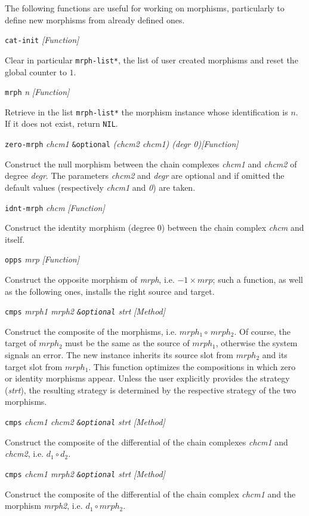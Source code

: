 The following functions are useful for working on morphisms, particularly to define
new morphisms from already defined ones.
\vskip 0.50cm
{\parindent=0mm
{\leftskip=5mm
{\tt cat-init} \hfill {\em [Function]} \par}
{\leftskip=15mm
Clear in particular {\tt *mrph-list*}, the list of user created morphisms  and reset
the global counter to $1$. \par}
{\leftskip=5mm
{\tt mrph} {\em n} \hfill {\em [Function]}\par}
{\leftskip=15mm
Retrieve in the list {\tt *mrph-list*} the morphism instance whose identification
is $n$. If it does not exist, return {\tt NIL}. \par}
{\leftskip=5mm
{\tt zero-mrph} {\em chcm1} {\tt \&optional} {\em (chcm2 chcm1) (degr 0)}\hfill {\em [Function]} \par}
{\leftskip=15mm
Construct the null morphism between the chain complexes {\em chcm1} and {\em chcm2} of degree {\em degr}.
The parameters {\em chcm2} and {\em degr} are optional and if omitted the  default values
(respectively {\em chcm1} and {\em 0}) are taken.  \par}
{\leftskip=5mm
{\tt idnt-mrph} {\em chcm} \hfill{\em [Function]}\par }
{\leftskip=15mm
Construct the identity morphism (degree $0$) between the chain complex {\em chcm} and itself. \par}
{\leftskip=5mm
{\tt opps} {\em mrp} \hfill{\em [Function]}\par }
{\leftskip=15mm
Construct the opposite morphism of {\em mrph}, i.e. $-1 \times mrp$; such a function, as well as
the following ones, installs the right source and target. \par}
{\leftskip=5mm
{\tt cmps} {\em mrph1 mrph2 {\tt \&optional} strt} \hfill{\em [Method]}\par }
{\leftskip=15mm
Construct the  composite of the morphisms, i.e. $mrph_1 \circ\, mrph_2$.
Of course, the target of $mrph_2$ must be the same as the source of $mrph_1$, otherwise the
system signals an error. The new instance  inherits
its source slot from $mrph_2$ and its target slot from $mrph_1$. This function optimizes
the compositions in which zero or identity morphisms appear. Unless the user explicitly provides
the  strategy ({\em strt}), the resulting strategy is determined by the respective strategy
of the two morphisms.\par}
{\leftskip=5mm
{\tt cmps} {\em chcm1 chcm2 {\tt \&optional} strt} \hfill{\em [Method]}\par }
{\leftskip=15mm
Construct the composite of the differential of the chain complexes {\em chcm1} and  {\em chcm2},
i.e. $d_1 \circ d_2$. \par}
{\leftskip=5mm
{\tt cmps} {\em chcm1 mrph2 {\tt \&optional} strt} \hfill{\em [Method]}\par }
{\leftskip=15mm
Construct the composite of the differential of the chain complex {\em chcm1} and the
morphism  {\em mrph2}, i.e. $d_1 \circ mrph_2$. \par}
}
